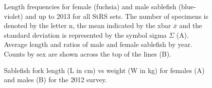 \documentclass[12pt]{article}\usepackage[]{graphicx}\usepackage[]{color}
\begin{document}
\begin{figure}[htb]

{\centering {} 

}

\caption{Length frequencies for female (fuchsia) and male sablefish (blue-violet) and up to 2013 for all StRS sets. The number of specimens is denoted by the letter n, the mean indicated by the xbar \(\overline{x}\) and the standard deviation is represented by the symbol sigma \(\Sigma\) (A). Average length and ratios of male and female sablefish by year. Counts by sex are shown across the top of the lines (B).}\label{fig:figure10}
\end{figure}
\clearpage


\begin{figure}[htb]

{\centering {} 

}

\caption{Sablefish fork length (L in cm) vs weight (W in kg) for females (A) and males (B) for the 2012 survey.}\label{fig:figure11}
\end{figure}
\end{document}
